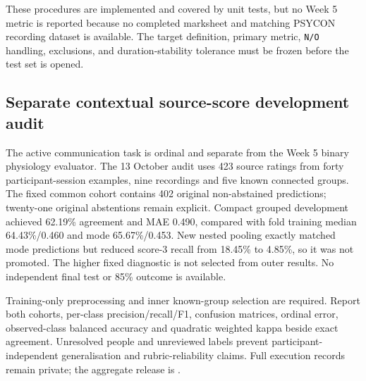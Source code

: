 \begin{observationbox}
These procedures are implemented and covered by unit tests, but no Week 5 metric is reported because no completed marksheet and matching PSYCON recording dataset is available. The target definition, primary metric, \texttt{N/O} handling, exclusions, and duration-stability tolerance must be frozen before the test set is opened.
\end{observationbox}


\subsection{Separate contextual source-score development audit}
The active communication task is ordinal and separate from the Week 5 binary physiology evaluator. The 13 October audit uses 423 source ratings from forty participant-session examples, nine recordings and five known connected groups. The fixed common cohort contains 402 original non-abstained predictions; twenty-one original abstentions remain explicit. Compact grouped development achieved 62.19\% agreement and MAE 0.490, compared with fold training median 64.43\%/0.460 and mode 65.67\%/0.453. New nested pooling exactly matched mode predictions but reduced score-3 recall from 18.45\% to 4.85\%, so it was not promoted. The higher fixed diagnostic is not selected from outer results. No independent final test or 85\% outcome is available.

Training-only preprocessing and inner known-group selection are required. Report both cohorts, per-class precision/recall/F1, confusion matrices, ordinal error, observed-class balanced accuracy and quadratic weighted kappa beside exact agreement. Unresolved people and unreviewed labels prevent participant-independent generalisation and rubric-reliability claims. Full execution records remain private; the aggregate release is .
